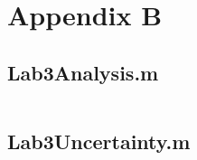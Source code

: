 \chapter{Appendix B}
\label{cp:code}
\section{Lab3Analysis.m}

\inputminted{matlab}{Code/Lab3Analysis.m}\label{listing:data_analysis_script}

\section{Lab3Uncertainty.m}

\inputminted{matlab}{Code/Lab3Uncertainty.m}\label{listing:uncertainty_script}